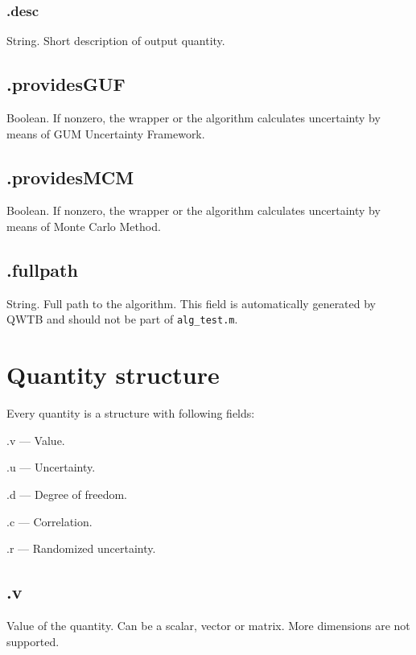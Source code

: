 \documentclass[12pt,a4paper,oneside]{report} %
\begin{document}
\subsubsection{\textsf{.desc}} %
String. Short description of output quantity.

\subsection{\textsf{.providesGUF}} %
Boolean. If nonzero, the wrapper or the algorithm calculates uncertainty by means of GUM Uncertainty
Framework.

\subsection{\textsf{.providesMCM}} %
Boolean. If nonzero, the wrapper or the algorithm calculates uncertainty by means of Monte Carlo
Method.

\subsection{\textsf{.fullpath}} %
String. Full path to the algorithm. This field is automatically generated by QWTB and should not be
part of {\tt alg\_test.m}.

\section{Quantity structure} %
\label{structquantity}
Every quantity is a structure with following fields:
\begin{tightdesc}
        \item [\textsf{.v}] --- Value.
        \item [\textsf{.u}] --- Uncertainty.
        \item [\textsf{.d}] --- Degree of freedom.
        \item [\textsf{.c}] --- Correlation.
        \item [\textsf{.r}] --- Randomized uncertainty.
\end{tightdesc}

\subsection{\textsf{.v}} %
Value of the quantity. Can be a scalar, vector or matrix. More dimensions are not
supported. 
\end{document}
